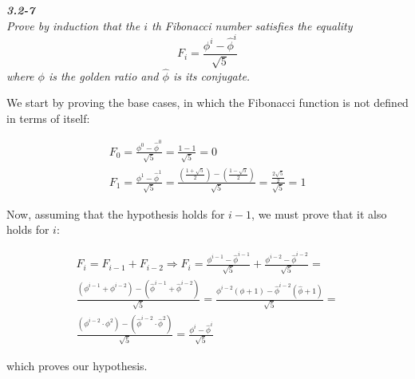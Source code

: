 \documentclass[8pt,a4paper]{article}
\begin{document}
\begin{framed}
\textbf{\textit{3.2-7}} \\
\textit{Prove by induction that the $i$ th Fibonacci number satisfies the equality
\begin{equation*}
  F_{i} = \frac{\phi^{i} - \widehat{\phi}^{i}}{\sqrt{5}}
\end{equation*}
where $\phi$ is the golden ratio and $\widehat{\phi}$ is its conjugate.
}
\end{framed}

  We start by proving the base cases, in which the Fibonacci function is not defined
in terms of itself:

\begin{equation*}
  \begin{split}
    F_{0} = \frac{\phi^{0} - \widehat{\phi}^{0}}{\sqrt{5}} = \frac{1 - 1}{\sqrt{5}} = 0 \\
    F_{1} = \frac{\phi^{1} - \widehat{\phi}^{1}}{\sqrt{5}} = 
      \frac{\left(\frac{1 + \sqrt{5}}{2}\right) - \left(\frac{1 - \sqrt{5}}{2}\right)}{\sqrt{5}} =
      \frac{\frac{2\sqrt{5}}{2}}{\sqrt{5}} = 1
  \end{split}
\end{equation*}

  Now, assuming that the hypothesis holds for $i - 1$, we must prove that it also holds for $i$:

\begin{equation*}
  \begin{split}
    F_{i} = F_{i - 1} + F_{i - 2}
      \Rightarrow F_{i} = \frac{\phi^{i - 1} - \widehat{\phi}^{i - 1}}{\sqrt{5}} + \frac{\phi^{i - 2} - \widehat{\phi}^{i - 2}}{\sqrt{5}} = \\
      \frac{\left(\phi^{i - 1} + \phi^{i - 2}\right) - \left(\widehat{\phi}^{i - 1} + \widehat{\phi}^{i - 2}\right)}{\sqrt{5}} =
      \frac{\phi^{i - 2}\left(\phi + 1\right) - \widehat{\phi}^{i - 2}\left(\widehat{\phi} + 1\right)}{\sqrt{5}} = \\
      \frac{\left(\phi^{i - 2} \cdot \phi^{2}\right) - \left(\widehat{\phi}^{i - 2} \cdot \widehat{\phi}^{2}\right)}{\sqrt{5}} =
      \frac{\phi^{i} - \widehat{\phi}^{i}}{\sqrt{5}}
  \end{split}
\end{equation*}

which proves our hypothesis.
\end{document}
